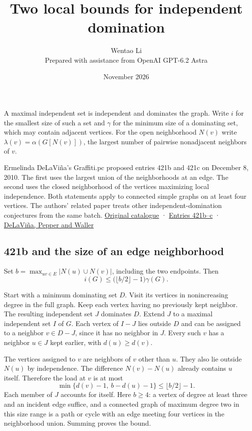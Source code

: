 \documentclass[11pt]{article}
\title{Two local bounds for independent domination}
\author{Wentao Li\\\small Prepared with assistance from OpenAI GPT-6.2 Astra}
\date{November 2026}
\begin{document}
\maketitle
A maximal independent set is independent and dominates the graph. Write \(i\) for the smallest size of such a set and \(\gamma\) for the minimum size of a dominating set, which may contain adjacent vertices. For the open neighborhood \(N(v)\) write \(\lambda(v)=\alpha(G[N(v)])\), the largest number of pairwise nonadjacent neighbors of \(v\).

Ermelinda DeLaViña's Graffiti.pc proposed entries 421b and 421c on December 8, 2010. The first uses the largest union of the neighborhoods at an edge. The second uses the closed neighborhood of the vertices maximizing local independence. Both statements apply to connected simple graphs on at least four vertices. The authors' related paper treats other independent-domination conjectures from the same batch. \href{https://www.uhd.edu/academics/sciences/mathematics-statistics/wowii/index.html}{Original catalogue} · \href{https://www.uhd.edu/academics/sciences/mathematics-statistics/wowii/files/conjectures.json}{Entries 421b--c} · \href{https://www.uhd.edu/documents/academics/sciences/dpw-cn2011.pdf}{DeLaViña, Pepper and Waller}

\subsection{421b and the size of an edge neighborhood}\label{b-and-the-size-of-an-edge-neighborhood}

Set \(b=\max_{uv\in E}|N(u)\cup N(v)|\), including the two endpoints. Then
\[i(G)\le \bigl(\lfloor b/2\rfloor-1\bigr)\gamma(G).\]

Start with a minimum dominating set \(D\). Visit its vertices in nonincreasing degree in the full graph. Keep each vertex having no previously kept neighbor. The resulting independent set \(J\) dominates \(D\). Extend \(J\) to a maximal independent set \(I\) of \(G\). Each vertex of \(I-J\) lies outside \(D\) and can be assigned to a neighbor \(v\in D-J\), since it has no neighbor in \(J\). Every such \(v\) has a neighbor \(u\in J\) kept earlier, with \(d(u)\ge d(v)\).

The vertices assigned to \(v\) are neighbors of \(v\) other than \(u\). They also lie outside \(N(u)\) by independence. The difference \(N(v)-N(u)\) already contains \(u\) itself. Therefore the load at \(v\) is at most
\[\min\{d(v)-1,\ b-d(u)-1\}\le\lfloor b/2\rfloor-1.\]
Each member of \(J\) accounts for itself. Here \(b\ge4\): a vertex of degree at least three and an incident edge suffice, and a connected graph of maximum degree two in this size range is a path or cycle with an edge meeting four vertices in the neighborhood union. Summing proves the bound.
\end{document}
